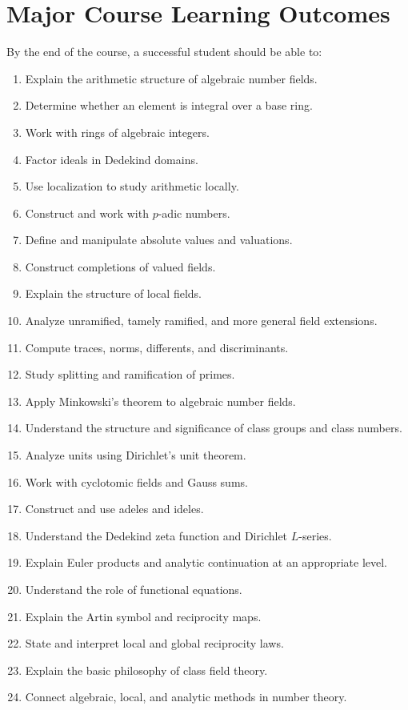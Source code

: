 \documentclass[11pt,a4paper]{article}
\begin{document}
\section{Major Course Learning Outcomes}

By the end of the course, a successful student should be able to:

\begin{enumerate}
    \item Explain the arithmetic structure of algebraic number fields.
    \item Determine whether an element is integral over a base ring.
    \item Work with rings of algebraic integers.
    \item Factor ideals in Dedekind domains.
    \item Use localization to study arithmetic locally.
    \item Construct and work with \(p\)-adic numbers.
    \item Define and manipulate absolute values and valuations.
    \item Construct completions of valued fields.
    \item Explain the structure of local fields.
    \item Analyze unramified, tamely ramified, and more general
    field extensions.
    \item Compute traces, norms, differents, and discriminants.
    \item Study splitting and ramification of primes.
    \item Apply Minkowski's theorem to algebraic number fields.
    \item Understand the structure and significance of class groups
    and class numbers.
    \item Analyze units using Dirichlet's unit theorem.
    \item Work with cyclotomic fields and Gauss sums.
    \item Construct and use adeles and ideles.
    \item Understand the Dedekind zeta function and Dirichlet
    \(L\)-series.
    \item Explain Euler products and analytic continuation at an
    appropriate level.
    \item Understand the role of functional equations.
    \item Explain the Artin symbol and reciprocity maps.
    \item State and interpret local and global reciprocity laws.
    \item Explain the basic philosophy of class field theory.
    \item Connect algebraic, local, and analytic methods in number
    theory.
\end{enumerate}
\end{document}
